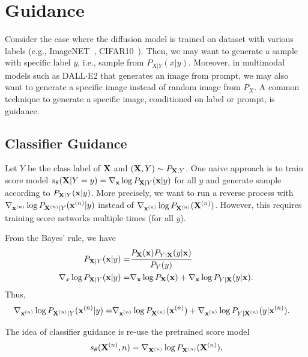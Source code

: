 \documentclass[11pt, a4paper]{article}
\begin{document}
\section{Guidance}
Consider the case where the diffusion model is trained on dataset with various labels (e.g., ImageNET~\cite{deng2009imagenet}, CIFAR10~\cite{krizhevsky2009learning}).
Then, we may want to generate a sample with specific label $y$, i.e., sample from $P_{X|Y}(x|y)$.
Moreover, in multimodal models such as DALL$\cdot$E2 that generates an image from prompt,
we may also want to generate a specific image instead of random image from $P_X$.
A common technique to generate a specific image, conditioned on label or prompt, is guidance.

\subsection{Classifier Guidance}
Let $Y$ be the class label of ${\bf X}$ and $({\bf X}, Y)\sim P_{{\bf X},Y}$.
One naive approach is to train score model $s_{\theta}({\bf X}|Y=y) = \nabla_{{\bf x}} \log P_{{\bf X}|Y}({\bf x}|y)$ for all $y$
and generate sample according to $P_{{\bf X}|Y}({\bf x}|y)$.
More precisely, we want to run a reverse process with $\nabla_{{\bf x}^{(n)}} \log P_{{\bf X}^{(n)}|Y}({\bf x}^{(n)}|y)$  instead of $\nabla_{{\bf x}^{(n)}} \log P_{{\bf X}^{(n)}}({\bf X}^{(n)})$.
However, this requires training score networks multiple times (for all $y$).

From the Bayes' rule, we have
\begin{align}
    P_{{\bf X}|Y}({\bf x}|y) =& \frac{P_{{\bf X}}({\bf x})P_{Y|{\bf X}}(y|{\bf x})}{P_Y(y)}\\
    \nabla_x \log P_{{\bf X}|Y}({\bf x}|y) =& \nabla_{{\bf x}} \log P_{\bf X}({\bf x}) + \nabla_{{\bf x}}\log P_{Y|{\bf X}}(y|{\bf x}).
\end{align}
Thus, 
\begin{align}
    \nabla_{{\bf x}^{(n)}}\log P_{{\bf X}^{(n)}|Y}({\bf x}^{(n)}|y) =&     \nabla_{{\bf x}^{(n)}}\log {P_{{\bf X}^{(n)}}({\bf x}^{(n)})}+    \nabla_{{\bf x}^{(n)}}\log{P_{Y|{\bf X}^{(n)}}(y|{\bf x}^{(n)})}.
\end{align}

The idea of classifier guidance is re-use the pretrained score model
\begin{align}
    s_{\theta}({\bf X}^{(n)}, n) = \nabla_{{\bf X}^{(n)}} \log P_{{\bf X}^{(n)}} ({\bf X}^{(n)}).
\end{align}
\end{document}
